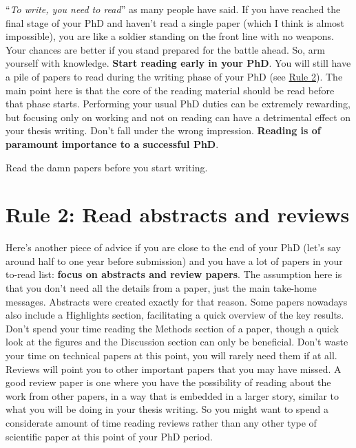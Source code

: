 \documentclass[
  12pt,
  oneside]{book}
\begin{document}
``\emph{To write, you need to read}'' as many people have said.
If you have reached the final stage of your PhD and haven't read a single paper (which I think is almost impossible), you are like a soldier standing on the front line with no weapons.
Your chances are better if you stand prepared for the battle ahead.
So, arm yourself with knowledge.
\textbf{Start reading early in your PhD}.
You will still have a pile of papers to read during the writing phase of your PhD (see \protect\hyperlink{rule2}{Rule 2}).
The main point here is that the core of the reading material should be read before that phase starts.
Performing your usual PhD duties can be extremely rewarding, but focusing only on working and not on reading can have a detrimental effect on your thesis writing.
Don't fall under the wrong impression.
\textbf{Reading is of paramount importance to a successful PhD}.

Read the damn papers before you start writing.

\hypertarget{rule2}{%
\section*{\texorpdfstring{\textbf{Rule 2:} Read abstracts and reviews}{Rule 2: Read abstracts and reviews}}\label{rule2}}

Here's another piece of advice if you are close to the end of your PhD (let's say around half to one year before submission) and you have a lot of papers in your to-read list: \textbf{focus on abstracts and review papers}.
The assumption here is that you don't need all the details from a paper, just the main take-home messages.
Abstracts were created exactly for that reason.
Some papers nowadays also include a Highlights section, facilitating a quick overview of the key results.
Don't spend your time reading the Methods section of a paper, though a quick look at the figures and the Discussion section can only be beneficial.
Don't waste your time on technical papers at this point, you will rarely need them if at all.
Reviews will point you to other important papers that you may have missed.
A good review paper is one where you have the possibility of reading about the work from other papers, in a way that is embedded in a larger story, similar to what you will be doing in your thesis writing.
So you might want to spend a considerate amount of time reading reviews rather than any other type of scientific paper at this point of your PhD period.
\end{document}
